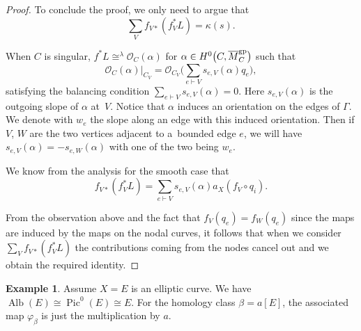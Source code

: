 \documentclass[pdftex]{sigma}
\newcommand{\Pic}{\operatorname{Pic}}
\newcommand{\Alb}{\operatorname{Alb}}
\renewcommand{\O}{\mathcal{O}}
\renewcommand{\bar}{\overline}
\numberwithin{equation}{section}
\theoremstyle{definition}
\newtheorem{expl}[theo]{Example}
\begin{document}
\begin{proof}
To conclude the proof, we only need to argue that
\[ \sum_V f_{V\ast}(f_V^*L)=\kappa(s).\]

When $C$ is singular, $f^*L\cong^{\lambda}\O_C(\alpha)$ for $\alpha\in H^0\bigl(C, \bar{M}_C^{\rm gp}\bigr)$ such that
\[\O_C(\alpha)\rvert_{C_V}=\O_{C_V}\biggl(\sum_{e\vdash V}s_{e,V}(\alpha)q_e\biggr),\]
satisfying the balancing condition $\sum_{e\vdash V}s_{e,V}(\alpha)=0$. Here $s_{e,V}(\alpha)$ is the outgoing slope of $\alpha$ at~$V$. Notice that $\alpha$ induces an orientation on the edges of $\Gamma$. We denote with $w_e$ the slope along an edge with this induced orientation. Then if $V$, $W$ are the two vertices adjacent to a~bounded edge $e$, we will have $s_{e,V}(\alpha)=-s_{e,W}(\alpha)$ with one of the two being $w_e$.

 We know from the analysis for the smooth case that
 \[f_{V\ast}(f_V^*L)=\sum_{e\vdash V}s_{e,V}(\alpha) a_X(f_V\circ q_i).\]

 From the observation above and the fact that $f_V(q_e)=f_W(q_e)$ since the maps are induced by the maps on the nodal curves, it follows that when we consider $\sum_Vf_{V\ast}(f_V^*L)$ the contributions coming from the nodes cancel out and we obtain the required identity.
\end{proof}

\begin{expl}
 Assume $X=E$ is an elliptic curve. We have $\Alb(E)\cong\Pic^0(E)\cong E$. For the homology class $\beta=a[E]$, the associated map $\varphi_\beta$ is just the multiplication by $a$.
\end{expl}
\end{document}
